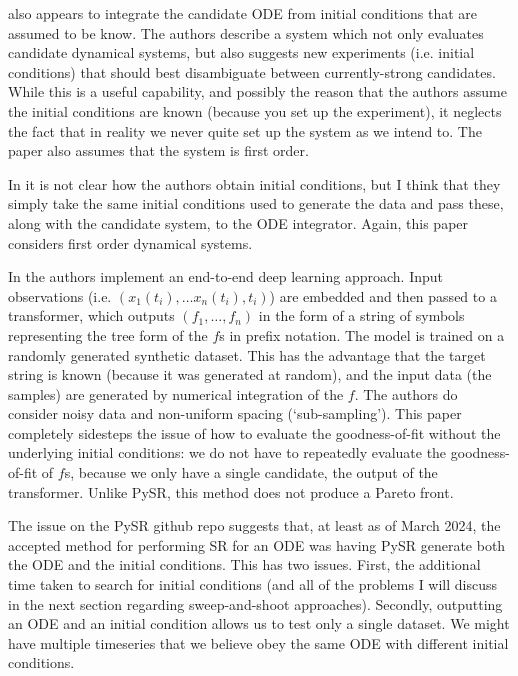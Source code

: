 \documentclass{article}
\begin{document}
\cite{bongard2007automated} also appears to integrate the candidate ODE from initial conditions that are assumed to be know.
The authors describe a system which not only evaluates candidate dynamical systems, but also suggests new experiments (i.e. initial conditions) that should best disambiguate between currently-strong candidates.
While this is a useful capability, and possibly the reason that the authors assume the initial conditions are known (because you set up the experiment), it neglects the fact that in reality we never quite set up the system as we intend to.
The paper also assumes that the system is first order.

In \cite{iba2008inference} it is not clear how the authors obtain initial conditions, but I think that they simply take the same initial conditions used to generate the data and pass these, along with the candidate system, to the ODE integrator. Again, this paper considers first order dynamical systems.

In \cite{d2023odeformer} the authors implement an end-to-end deep learning approach.
Input observations (i.e. $(x_1(t_i), \dots x_n(t_i), t_i)$) are embedded and then passed to a transformer, which outputs $(f_1, \dots, f_n)$ in the form of a string of symbols representing the tree form of the $f$s in prefix notation.
The model is trained on a randomly generated synthetic dataset.
This has the advantage that the target string is known (because it was generated at random), and the input data (the samples) are generated by numerical integration of the $f$.
The authors do consider noisy data and non-uniform spacing (`sub-sampling').
This paper completely sidesteps the issue of how to evaluate the goodness-of-fit without the underlying initial conditions: we do not have to repeatedly evaluate the goodness-of-fit of $f$s, because we only have a single candidate, the output of the transformer.
Unlike PySR, this method does not produce a Pareto front.

The issue \cite{pysrissue568} on the PySR github repo suggests that, at least as of March 2024, the accepted method for performing SR for an ODE was having PySR generate both the ODE and the initial conditions.
This has two issues.
First, the additional time taken to search for initial conditions (and all of the problems I will discuss in the next section regarding sweep-and-shoot approaches).
Secondly, outputting an ODE and an initial condition allows us to test only a single dataset.
We might have multiple timeseries that we believe obey the same ODE with different initial conditions.
\end{document}
